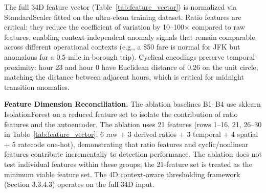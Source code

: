 The full 34D feature vector (Table~\ref{tab:feature_vector}) is normalized via StandardScaler fitted on the ultra-clean training dataset. Ratio features are critical: they reduce the coefficient of variation by 10--100$\times$ compared to raw features, enabling context-independent anomaly signals that remain comparable across different operational contexts (e.g., a \$50 fare is normal for JFK but anomalous for a 0.5-mile in-borough trip). Cyclical encodings preserve temporal proximity: hour 23 and hour 0 have Euclidean distance of 0.26 on the unit circle, matching the distance between adjacent hours, which is critical for midnight transition anomalies.

\textbf{Feature Dimension Reconciliation.} The ablation baselines B1--B4 use sklearn IsolationForest on a reduced feature set to isolate the contribution of ratio features and the autoencoder. The ablation uses 21 features (rows 1--16, 21, 26--30 in Table~\ref{tab:feature_vector}: 6 raw + 3 derived ratios + 3 temporal + 4 spatial + 5 ratecode one-hot), demonstrating that ratio features and cyclic/nonlinear features contribute incrementally to detection performance. The ablation does not test individual features within these groups; the 21-feature set is treated as the minimum viable feature set. The 4D context-aware thresholding framework (Section 3.3.4.3) operates on the full 34D input.

